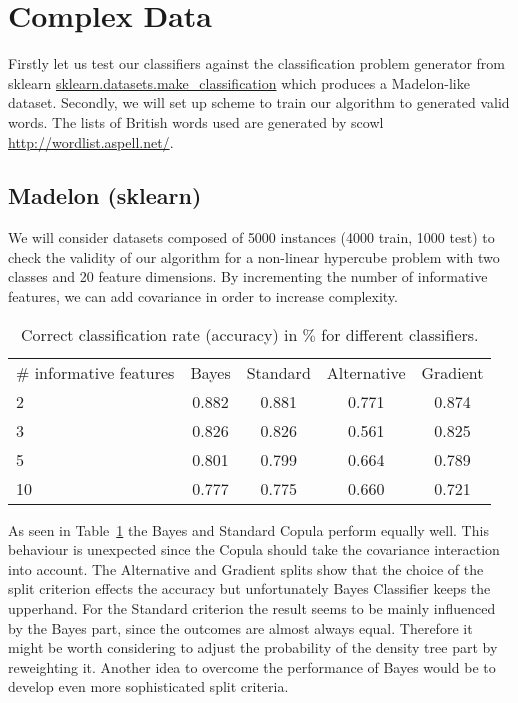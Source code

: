 \documentclass[draft]{article}
\begin{document}
\section{Complex Data}
Firstly let us test our classifiers against the classification problem generator from sklearn
\url{sklearn.datasets.make_classification} which produces a Madelon-like dataset.
Secondly, we will set up scheme to train our algorithm to generated valid words.
The lists of British words used are generated by scowl \url{http://wordlist.aspell.net/}.

\subsection{Madelon (sklearn)}
We will consider datasets composed of 5000 instances (4000 train, 1000 test) to check the validity
of our algorithm for a non-linear hypercube problem with two classes and 20 feature dimensions.
By incrementing the number of informative features, we can add covariance in order to
increase complexity.

\begin{table}[h]
	\centering
	\begin{tabular}{l c c c c  }
		\# informative features	& Bayes 	& Standard	& Alternative & Gradient	\\
		2			&	0.882	&	0.881	& 0.771		& 0.874 \\
	 	3			&   0.826	&	0.826	& 0.561		& 0.825 \\
		5			& 	0.801	&	0.799	& 0.664		& 0.789	\\
		10			& 	0.777	&	0.775	& 0.660		& 0.721	\\
	\end{tabular}
	\caption{Correct classification rate (accuracy) in $\%$ for different classifiers.}
	\label{tab6}
\end{table}

As seen in Table~\ref{tab6} the Bayes and Standard Copula perform equally well. This
behaviour is unexpected since the Copula should take the covariance interaction into account.
The Alternative and Gradient splits show that the choice of the split criterion
effects the accuracy but unfortunately Bayes Classifier keeps the upperhand.
\newline
For the Standard criterion the result seems to be mainly influenced by the Bayes part,
since the outcomes are almost always equal.
Therefore it might be worth considering to adjust the probability of the density tree part
by reweighting it.
Another idea to overcome the performance of Bayes would be to develop even more sophisticated
split criteria.
\end{document}
